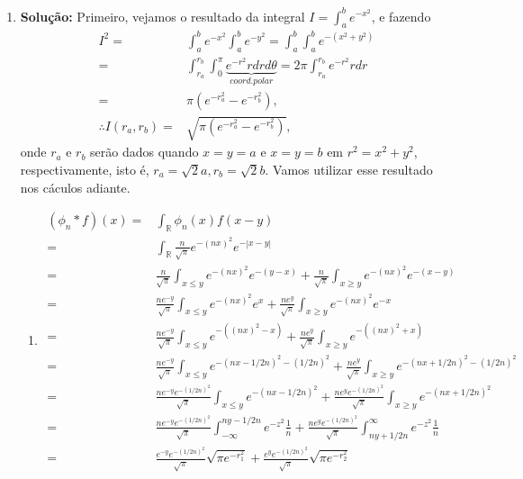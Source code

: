 \documentclass{article}
\begin{document}
\begin{enumerate}
		\item \textbf{Solução:} Primeiro, vejamos o resultado da integral $I = \int_{a}^{b} e^{-x^{2}}$, e fazendo 
		$$
		\begin{aligned}
		I^{2} = & \int_{a}^{b} e^{-x^{2}}\int_{a}^{b} e^{-y^{2}} = \int_{a}^{b} \int_{a}^{b} e^{-(x^{2}+y^{2})} 
		\\
		= & \int_{r_{a}}^{r_{b}} \int_{0}^{\pi} \underbrace{ e^{-r^{2}}r dr d\theta }_{coord. polar} = 2\pi \int_{r_{a}}^{r_{b}} e^{-r^{2}}r dr
		\\
		= & \pi (e^{-r_{a}^{2}} - e^{-r_{b}^{2}}),
		\\
		\therefore I(r_{a}, r_{b}) = & \sqrt{\pi (e^{-r_{a}^{2}} - e^{-r_{b}^{2}})},
		\end{aligned}
		$$
		onde $r_{a}$ e $r_{b}$ serão dados quando $x=y=a$ e $x=y=b$ em  $r^{2} = x^{2}+y^{2}$, respectivamente, isto é, $r_{a} = \sqrt{2}a, r_{b} = \sqrt{2}b$. Vamos utilizar esse resultado nos cáculos adiante.
			\begin{enumerate}
				\item
					$$
					\begin{aligned}
					(\phi_{n}*f)(x) = &\int_{\mathbb{R}} \phi_{n}(x)f(x-y)
					\\
					= &\int_{\mathbb{R}} \frac{n}{\sqrt{\pi}}e^{-(nx)^{2}} e^{-|x-y|}
					\\
					= & \frac{n}{\sqrt{\pi}}\int_{x \leq y} e^{-(nx)^{2}} e^{-(y-x)} + \frac{n}{\sqrt{\pi}}\int_{x \geq y} e^{-(nx)^{2}} e^{-(x-y)}
					\\
					= & \frac{ne^{-y}}{\sqrt{\pi}}\int_{x \leq y} e^{-(nx)^{2}} e^{x} + \frac{ne^{y}}{\sqrt{\pi}}\int_{x \geq y} e^{-(nx)^{2}} e^{-x}
					\\
					= & \frac{ne^{-y}}{\sqrt{\pi}}\int_{x \leq y} e^{-((nx)^{2} -x)}  + \frac{ne^{y}}{\sqrt{\pi}}\int_{x \geq y} e^{-((nx)^{2}+x)}
					\\
					= & \frac{ne^{-y}}{\sqrt{\pi}}\int_{x \leq y} e^{-(nx - 1/2n)^{2} - (1/2n)^{2}} + \frac{ne^{y}}{\sqrt{\pi}}\int_{x \geq y} e^{-(nx + 1/2n)^{2} - (1/2n)^{2}}
					\\
					= & \frac{ne^{-y}e^{- (1/2n)^{2}}}{\sqrt{\pi}}\int_{x \leq y} e^{-(nx - 1/2n)^{2}} + \frac{ne^{y}e^{ - (1/2n)^{2}}}{\sqrt{\pi}}\int_{x \geq y} e^{-(nx + 1/2n)^{2}}
					\\
					= & \frac{ne^{-y}e^{- (1/2n)^{2}}}{\sqrt{\pi}} \int_{-\infty}^{ny-1/2n} e^{-z^{2}}\frac{1}{n} + \frac{ne^{y}e^{ - (1/2n)^{2}}}{\sqrt{\pi}}\int_{ny+1/2n}^{\infty} e^{-z^{2}}\frac{1}{n}
					\\
					= & \frac{e^{-y}e^{- (1/2n)^{2}}}{\sqrt{\pi}} \sqrt{\pi e^{-r_{1}^{2}}} + \frac{e^{y}e^{ - (1/2n)^{2}}}{\sqrt{\pi}}\sqrt{\pi e^{-r_{2}^{2}}}

\end{aligned}$$
\end{enumerate}
\end{enumerate}
\end{document}
